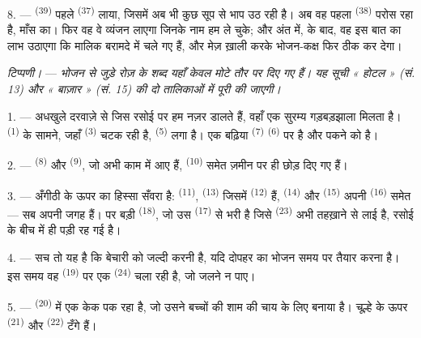 8. ---  \textsuperscript{(39)} पहले 
\textsuperscript{(37)} लाया, जिसमें अब भी कुछ सूप से भाप उठ रही है। अब वह पहला
 \textsuperscript{(38)} परोस रहा है, माँस का। फिर वह वे व्यंजन
लाएगा जिनके नाम हम ले चुके; और अंत में,  के बाद, वह इस बात का लाभ
उठाएगा कि मालिक बरामदे में चले गए हैं, और मेज़ ख़ाली करके भोजन-कक्ष फिर ठीक कर
देगा।

\textit{टिप्पणी।} --- \textit{भोजन से जुड़े रोज़ के शब्द यहाँ केवल मोटे तौर पर
दिए गए हैं। यह सूची « होटल » (सं. 13) और « बाज़ार » (सं. 15) की दो तालिकाओं में
पूरी की जाएगी।}

\VUsaut{4.6mm}
\VUsaut{3.0mm}

1. --- अधखुले दरवाज़े से जिस रसोई पर हम नज़र डालते हैं, वहाँ एक सुरम्य
गड़बड़झाला मिलता है।  \textsuperscript{(1)} के सामने, जहाँ
 \textsuperscript{(3)} चटक रही है, 
\textsuperscript{(5)} लगा है। एक बढ़िया  \textsuperscript{(7)}
 \textsuperscript{(6)} पर है और पकने को है।

2. ---  \textsuperscript{(8)} और 
\textsuperscript{(9)}, जो अभी काम में आए हैं, 
\textsuperscript{(10)} समेत ज़मीन पर ही छोड़ दिए गए हैं।

3. --- अँगीठी के ऊपर का हिस्सा सँवरा है:  \textsuperscript{(11)},
 \textsuperscript{(13)} जिसमें 
\textsuperscript{(12)} हैं,  \textsuperscript{(14)} और
 \textsuperscript{(15)} अपनी 
\textsuperscript{(16)} समेत — सब अपनी जगह हैं। पर बड़ी 
\textsuperscript{(18)}, जो उस  \textsuperscript{(17)} से भरी है जिसे
 \textsuperscript{(23)} अभी तहख़ाने से लाई है, रसोई के बीच में ही
पड़ी रह गई है।

4. --- सच तो यह है कि बेचारी को जल्दी करनी है, यदि दोपहर का भोजन समय पर तैयार
करना है। इस समय वह  \textsuperscript{(19)} पर एक
 \textsuperscript{(24)} चला रही है, जो जलने न पाए।

5. ---  \textsuperscript{(20)} में एक केक पक रहा है, जो उसने बच्चों
की शाम की चाय के लिए बनाया है। चूल्हे के ऊपर  \textsuperscript{(21)}
और  \textsuperscript{(22)} टँगे हैं।

